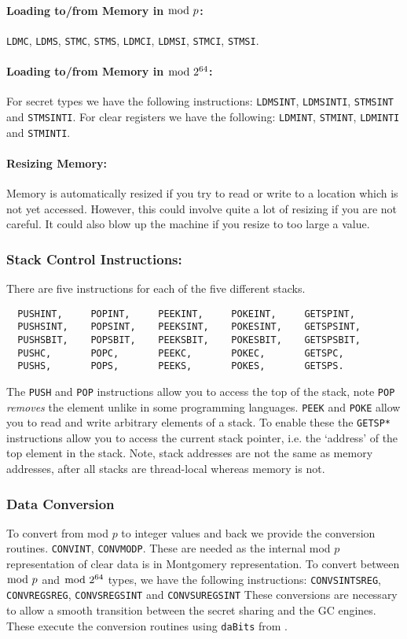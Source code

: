 \paragraph{Loading to/from Memory in $\bmod \; p$:}
 \verb+LDMC+,
 \verb+LDMS+,
 \verb+STMC+,
 \verb+STMS+,
 \verb+LDMCI+,
 \verb+LDMSI+,
 \verb+STMCI+,
 \verb+STMSI+.

\paragraph{Loading to/from Memory in $\bmod \; 2^{64}$:}
For secret types we have the following instructions: \verb+LDMSINT+, \verb+LDMSINTI+, \verb+STMSINT+ and \verb+STMSINTI+. For clear registers we have the following: \verb+LDMINT+, \verb+STMINT+, \verb+LDMINTI+ and \verb+STMINTI+.

\paragraph{Resizing Memory:}
Memory is automatically resized if you try to read or write to
a location which is not yet accessed. However, this could involve
quite a lot of resizing if you are not careful. It could also
blow up the machine if you resize to too large a value.

\subsubsection{Stack Control Instructions:}
There are five instructions for each of the five different stacks.
\begin{verbatim}
  PUSHINT,     POPINT,     PEEKINT,     POKEINT,     GETSPINT,
  PUSHSINT,    POPSINT,    PEEKSINT,    POKESINT,    GETSPSINT,
  PUSHSBIT,    POPSBIT,    PEEKSBIT,    POKESBIT,    GETSPSBIT,
  PUSHC,       POPC,       PEEKC,       POKEC,       GETSPC,
  PUSHS,       POPS,       PEEKS,       POKES,       GETSPS.
\end{verbatim}
The \verb+PUSH+ and \verb+POP+ instructions allow you to access the top
of the stack, note \verb+POP+ {\em removes} the element unlike
in some programming languages.
\verb+PEEK+ and \verb+POKE+ allow you to read and write arbitrary elements
of a stack.
To enable these the \verb+GETSP*+ instructions allow you
to access the current stack pointer, i.e. the `address'
of the top element in the stack.
Note, stack addresses are not the same as memory addresses,
after all stacks are thread-local whereas memory is not.


\subsubsection{Data Conversion}
To convert from mod $p$ to integer values and
back we provide the conversion routines.
\verb+CONVINT+, \verb+CONVMODP+.
These are needed as the internal mod $p$ representation
of clear data is in Montgomery representation.
To convert between $\bmod \; p$ and $\bmod \; 2^{64}$ types, we have the following instructions:
\verb+CONVSINTSREG+, \verb+CONVREGSREG+, \verb+CONVSREGSINT+ and \verb+CONVSUREGSINT+
These conversions are necessary to allow a smooth transition between the secret sharing and the GC engines.
These execute the conversion routines using \verb+daBits+ from \cite{daBitPaper}.

